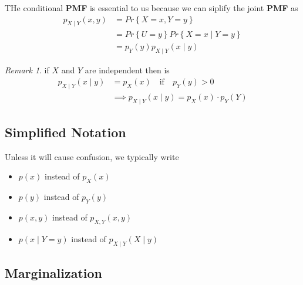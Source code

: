 \documentclass{article}
\theoremstyle{remark}
\newtheorem*{remark}{Remark}
\begin{document}
  THe conditional \textbf{PMF}  is essential to us because we can siplify the joint \textbf{PMF}  as \[
    \begin{split}
  p_{X \mid Y}  \left( x,y \right)   & = Pr \left \{ X =x , Y = y \right \}  \\
    &  = Pr \left \{ U = y   \right \}  Pr \left \{ X = x  \mid  Y =y \right \}   \\
    &= p_{Y} \left( y \right) p_{X \mid Y} \left( x  \mid  y \right)
    \end{split} 
  \] 
  \begin{remark}
    if $X $ and $Y$ are independent then is \[
    \begin{split}
      p_{X \mid Y}  \left( x  \mid y \right) &= p_{X} \left( x \right) \quad \text{if} \quad  p_{Y} \left( y \right) > 0 \\
       &  \implies  p_{X \mid Y}  \left( x  \mid y \right) = p_{X}  \left( x \right) \cdot  p_{Y} \left( Y \right) 
    \end{split} 
    \] 
  \end{remark}

  \subsection{Simplified Notation}%
  \label{sub:simplified_notation}
  
  Unless it will cause confusion, we typically write 
  \begin{itemize}
    \item $p\left( x \right) $ instead of $p_{X} \left( x \right)$ 
    \item $p \left( y \right) $ instead of $p_{Y} \left( y \right)$ 
    \item $p\left( x,y \right) $ instead of $p_{X  ,Y} \left( x,y \right) $
    \item $p\left( x  \mid  Y =y \right)$ instead of $ p_{X \mid Y} \left( X  \mid  y \right)$
  \end{itemize}

  \subsection{Marginalization}%
  \label{sub:marginalization}
  
\end{document}
